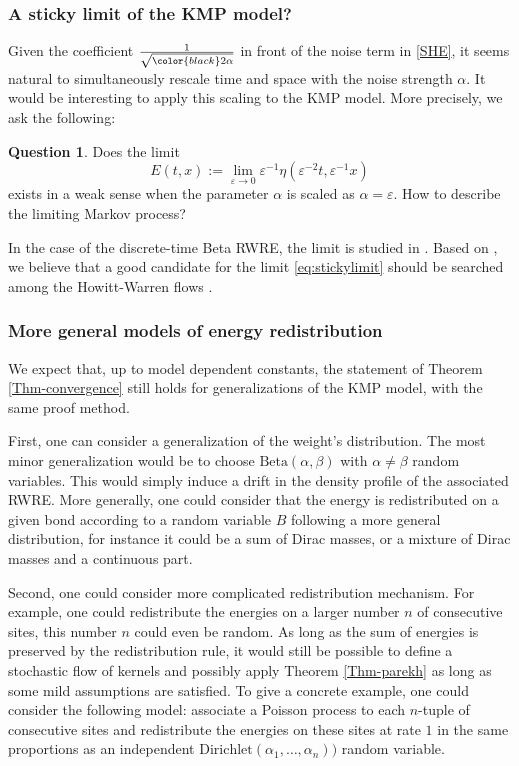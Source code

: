 \documentclass[a4paper,11pt,oneside,reqno]{amsart}
\theoremstyle{definition}
\newtheorem{question}[theorem]{Question}
\newcommand{\eps}{\varepsilon}
\numberwithin{equation}{section}
\begin{document}
\subsubsection{A sticky limit of the KMP model?}
	Given the coefficient $\frac{1}{\sqrt{{\color{black}2}\alpha}}$ in front of the noise term in \eqref{SHE}, it seems natural to simultaneously rescale time and space with the noise strength $\alpha$. It would be interesting to apply this scaling to the KMP model. More precisely, we ask the following: 
	\begin{question}
		Does the limit 
	\begin{equation}
		E(t,x):= \lim_{\eps\to 0 } \eps^{-1} \eta(\eps^{-2}t, \eps^{-1}x)
		\label{eq:stickylimit}
	\end{equation} 
		exists in a weak sense when the parameter $\alpha$ is scaled {\color{black}as} $\alpha=\eps$. How to describe the limiting Markov process? 
	\end{question}
 In the case of the discrete-time Beta RWRE, the limit is studied in \cite{le2004products,
 	jan2004sticky,howitt2009consistent,le2013markovian,brownianWeb,barraquand2020large,barraquand2022,brockington2023bethe}. Based on \cite{brownianWeb}, we believe that a good candidate for the limit \eqref{eq:stickylimit} should be searched among the  Howitt-Warren flows \cite{howitt2009consistent}. 
	
\subsubsection{More general models of energy redistribution} We expect that, up to model dependent constants, the statement of Theorem \ref{Thm-convergence} still holds for generalizations of the KMP model, with the same proof method. 

 First, one can consider a generalization of the weight's distribution. The most minor generalization would be to choose $\text{Beta}(\alpha,\beta)$ with $\alpha\neq \beta$ random variables. This would simply induce a drift in the density profile of the associated RWRE. More generally, one could consider that the energy is redistributed on a given bond according to a random variable $B$ following a more general distribution, for instance it could be a sum of Dirac masses, or a mixture of Dirac masses and a continuous part. 
 
 Second, one could consider more complicated redistribution mechanism. For example, one could redistribute the energies on a larger number $n$ of consecutive sites, this number $n$ could even be random. As long as the sum of energies is preserved by the redistribution rule, it would still be possible to define a stochastic flow of kernels and possibly apply Theorem \ref{Thm-parekh} as long as some mild assumptions are satisfied. To give a concrete example,  one could consider the following model: associate a Poisson process to each $n$-tuple of consecutive sites and redistribute the energies on these sites at rate $1$ in the same proportions as an independent  $\text{Dirichlet}(\alpha_{1},\ldots,\alpha_{n}))$ random variable.
 
\end{document}
